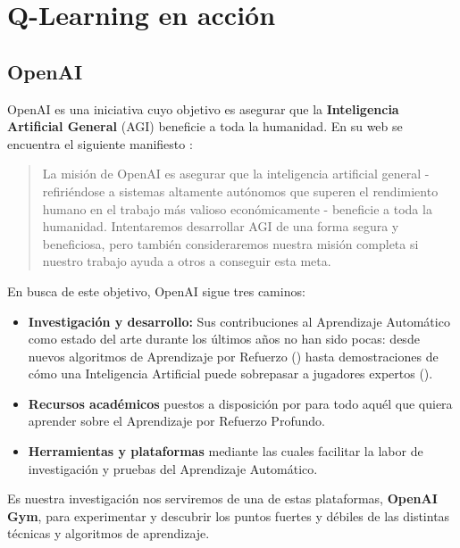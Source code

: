 \chapter{Q-Learning en acción}
\label{cap:q-learning}


\section{OpenAI}
OpenAI es una iniciativa cuyo objetivo es asegurar que la \textbf{Inteligencia Artificial General} (AGI) beneficie a toda la humanidad. En su web se encuentra el siguiente manifiesto \citep{OpenAI_charter}:

\begin{quote}
    La misión de OpenAI es asegurar que la inteligencia artificial general - refiriéndose a sistemas altamente autónomos que superen el rendimiento humano en el trabajo más valioso económicamente - beneficie a toda la humanidad. Intentaremos desarrollar AGI de una forma segura y beneficiosa, pero también consideraremos nuestra misión completa si nuestro trabajo ayuda a otros a conseguir esta meta. 
\end{quote}

En busca de este objetivo, OpenAI sigue tres caminos:
\begin{itemize}
    \item \textbf{Investigación y desarrollo:} Sus contribuciones al Aprendizaje Automático como estado del arte durante los últimos años no han sido pocas: desde nuevos algoritmos de Aprendizaje por Refuerzo (\citet{baselines}) hasta demostraciones de cómo una Inteligencia Artificial puede sobrepasar a jugadores expertos (\citet{OpenAI_dota}).
    \item \textbf{Recursos académicos} puestos a disposición por \citet{spinningup} para todo aquél que quiera aprender sobre el Aprendizaje por Refuerzo Profundo.
    \item \textbf{Herramientas y plataformas} mediante las cuales facilitar la labor de investigación y pruebas del Aprendizaje Automático.
\end{itemize}

Es nuestra investigación nos serviremos de una de estas plataformas, \textbf{OpenAI Gym}, para experimentar y descubrir los puntos fuertes y débiles de las distintas técnicas y algoritmos de aprendizaje.

